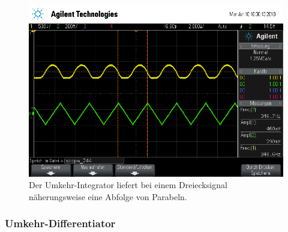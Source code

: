\begin{figure}[h]
	\centering
	\includegraphics[width=\textwidth]{usb/scope_244.png}
	\caption{Der Umkehr-Integrator liefert bei einem Dreiecksignal näherungsweise eine Abfolge von Parabeln.}
	\label{scope_244}
\end{figure}

\FloatBarrier

\subsubsection{Umkehr-Differentiator}

